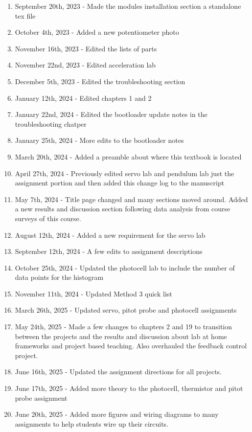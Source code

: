 \documentclass{article}
\begin{document}
\begin{enumerate}[itemsep=-5pt]
\item September 20th, 2023 - Made the modules installation section a standalone tex file
\item October 4th, 2023 - Added a new potentiometer photo
\item November 16th, 2023 - Edited the lists of parts 
\item November 22nd, 2023 - Edited acceleration lab
\item December 5th, 2023 - Edited the troubleshooting section
\item January 12th, 2024 - Edited chapters 1 and 2
\item January 22nd, 2024 - Edited the bootloader update notes in the troubleshooting chatper
\item January 25th, 2024 - More edits to the bootloader notes
\item March 20th, 2024 - Added a preamble about where this textbook is located
\item April 27th, 2024 - Previously edited servo lab and pendulum lab just the assignment portion and then added this change log to the manuscript
\item May 7th, 2024 - Title page changed and many sections moved around. Added a new results and discussion section following data analysis from course surveys of this course.
\item August 12th, 2024 - Added a new requirement for the servo lab
\item September 12th, 2024 - A few edits to assignment descriptions
\item October 25th, 2024 - Updated the photocell lab to include the number of data points for the histogram
\item November 11th, 2024 - Updated Method 3 quick list
\item March 26th, 2025 - Updated servo, pitot probe and photocell assignments
\item May 24th, 2025 - Made a few changes to chapters 2 and 19 to transition between the projects and the results and discussion about lab at home frameworks and project based teaching. Also overhauled the feedback control project. 
\item June 16th, 2025 - Updated the assignment directions for all projects.
\item June 17th, 2025 - Added more theory to the photocell, thermistor and pitot probe assignment
\item June 20th, 2025 - Added more figures and wiring diagrams to many assignments to help students wire up their circuits.

\end{enumerate}
\end{document}
